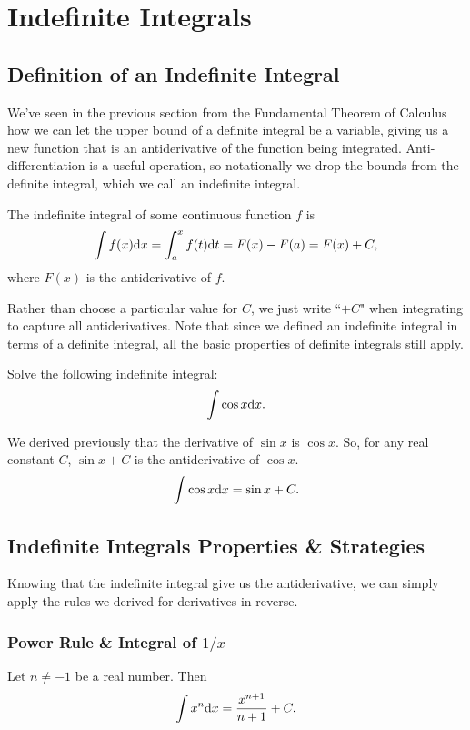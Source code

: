 \section{Indefinite Integrals}

\subsection{Definition of an Indefinite Integral}
We've seen in the previous section from the Fundamental Theorem of Calculus how we can let the upper bound of a definite integral be a variable, giving us a new function that is an antiderivative of the function being integrated.
Anti-differentiation is a useful operation, so notationally we drop the bounds from the definite integral, which we call an indefinite integral.
\begin{definition}
	The indefinite integral of some continuous function $f$ is
	\begin{equation*}
		\int{f(x)\mathrm{d} x} = \int_{a}^{x}{f(t)\mathrm{d} t} = F(x) - F(a) = F(x) + C,
	\end{equation*}
	where $F(x)$ is the antiderivative of $f$.
\end{definition}
\noindent
Rather than choose a particular value for $C$, we just write ``$+C$" when integrating to capture all antiderivatives.
Note that since we defined an indefinite integral in terms of a definite integral, all the basic properties of definite integrals still apply.

\begin{example}
	Solve the following indefinite integral:
	\begin{equation*}
		\int{\cos{x}\mathrm{d} x}.
	\end{equation*}
\end{example}
We derived previously that the derivative of $\sin{x}$ is $\cos{x}$.
So, for any real constant $C$, $\sin{x} + C$ is the antiderivative of $\cos{x}$.
\begin{equation*}
	\int{\cos{x}\mathrm{d} x} = \sin{x} + C.
\end{equation*}

\subsection{Indefinite Integrals Properties \& Strategies}
Knowing that the indefinite integral give us the antiderivative, we can simply apply the rules we derived for derivatives in reverse.

\subsubsection{Power Rule \& Integral of $1/x$}
\begin{lemma}
	Let $n \neq -1$ be a real number.
	Then
	\begin{equation*}
		\int{x^n \mathrm{d} x} = \frac{x^{n+1}}{n+1} + C.
	\end{equation*}
\end{lemma}

